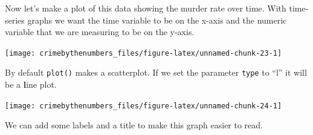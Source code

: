 \documentclass[
]{krantz}
\makeatletter
\newenvironment{Shaded}{\begin{snugshade}}{\end{snugshade}}
\newcommand{\AttributeTok}[1]{\textcolor[rgb]{0.61,0.61,0.61}{#1}}
\newcommand{\FunctionTok}[1]{\textcolor[rgb]{0,0,0}{#1}}
\newcommand{\NormalTok}[1]{#1}
\newcommand{\SpecialCharTok}[1]{\textcolor[rgb]{0,0,0}{#1}}
\newcommand{\StringTok}[1]{\textcolor[rgb]{0.5,0.5,0.5}{#1}}
\newenvironment{kframe}{%
\medskip{}
\setlength{\fboxsep}{.8em}
 \def\at@end@of@kframe{}%
 \ifinner\ifhmode%
  \def\at@end@of@kframe{\end{minipage}}%
  \begin{minipage}{\columnwidth}%
 \fi\fi%
 \def\FrameCommand##1{\hskip\@totalleftmargin \hskip-\fboxsep
 \colorbox{shadecolor}{##1}\hskip-\fboxsep
     \hskip-\linewidth \hskip-\@totalleftmargin \hskip\columnwidth}%
 \MakeFramed {\advance\hsize-\width
   \@totalleftmargin\z@ \linewidth\hsize
   \@setminipage}}%
 {\par\unskip\endMakeFramed%
 \at@end@of@kframe}
\renewenvironment{Shaded}{\begin{kframe}}{\end{kframe}}
\makeatother
\begin{document}
Now let's make a plot of this data showing the murder rate over time. With time-series graphs we want the time variable to be on the x-axis and the numeric variable that we are measuring to be on the y-axis.

\begin{Shaded}
\end{Shaded}

\begin{center}\texttt{[image: crimebythenumbers\_files/figure-latex/unnamed-chunk-23-1]} \end{center}

By default \texttt{plot()} makes a scatterplot. If we set the parameter \texttt{type} to ``l'' it will be a \textbf{l}ine plot.

\begin{Shaded}
\end{Shaded}

\begin{center}\texttt{[image: crimebythenumbers\_files/figure-latex/unnamed-chunk-24-1]} \end{center}

We can add some labels and a title to make this graph easier to read.

\begin{Shaded}
\end{Shaded}
\end{document}
